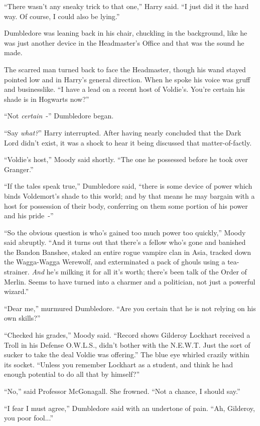 ``There wasn't any sneaky trick to that one,'' Harry said. ``I just did it the hard way. Of course, I could also be lying.''

Dumbledore was leaning back in his chair, chuckling in the background, like he was just another device in the Headmaster's Office and that was the sound he made.

The scarred man turned back to face the Headmaster, though his wand stayed pointed low and in Harry's general direction. When he spoke his voice was gruff and businesslike. ``I have a lead on a recent host of Voldie's. You're certain his shade is in Hogwarts now?''

``Not \emph{certain}~-'' Dumbledore began.

``Say \emph{what?}'' Harry interrupted. After having nearly concluded that the Dark Lord didn't exist, it was a shock to hear it being discussed that matter-of-factly.

``Voldie's host,'' Moody said shortly. ``The one he possessed before he took over Granger.''

``If the tales speak true,'' Dumbledore said, ``there is some device of power which binds Voldemort's shade to this world; and by that means he may bargain with a host for possession of their body, conferring on them some portion of his power and his pride~-''

``So the obvious question is who's gained too much power too quickly,'' Moody said abruptly. ``And it turns out that there's a fellow who's gone and banished the Bandon Banshee, staked an entire rogue vampire clan in Asia, tracked down the Wagga-Wagga Werewolf, and exterminated a pack of ghouls using a tea-strainer. \emph{And} he's milking it for all it's worth; there's been talk of the Order of Merlin. Seems to have turned into a charmer and a politician, not just a powerful wizard.''

``Dear me,'' murmured Dumbledore. ``Are you certain that he is not relying on his own skills?''

``Checked his grades,'' Moody said. ``Record shows Gilderoy Lockhart received a Troll in his Defense O.W.L.S., didn't bother with the N.E.W.T. Just the sort of sucker to take the deal Voldie was offering.'' The blue eye whirled crazily within its socket. ``Unless you remember Lockhart as a student, and think he had enough potential to do all that by himself?''

``No,'' said Professor McGonagall. She frowned. ``Not a chance, I should say.''

``I fear I must agree,'' Dumbledore said with an undertone of pain. ``Ah, Gilderoy, you poor fool...''

